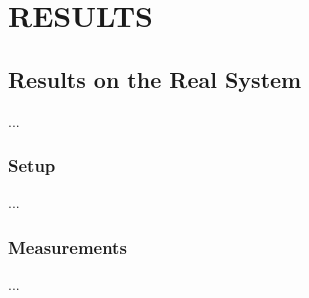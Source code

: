 %

\chapter{RESULTS}
\label{chap:results}

\section{Results on the Real System}
...

\subsection{Setup}
...

\subsection{Measurements}
...

